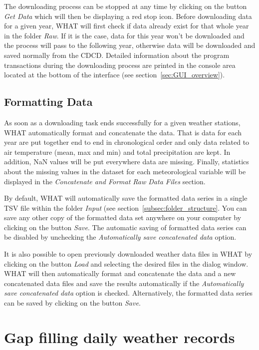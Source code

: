 \documentclass[WHATMANUAL.tex]{subfiles}
\begin{document}
The downloading process can be stopped at any time by clicking on the button \emph{Get Data} which will then be displaying a red stop icon. Before downloading data for a given year, WHAT will first check if data already exist for that whole year in the folder \emph{Raw}. If it is the case, data for this year won't be downloaded and the process will pass to the following year, otherwise data will be downloaded and saved normally from the CDCD. Detailed information about the program transactions during the downloading process are printed in the console area located at the bottom of the interface (see section~\ref{sec:GUI_overview}).

\subsection{Formatting Data}

As soon as a downloading task ends successfully for a given weather stations, WHAT automatically format and concatenate the data. That is data for each year are put together end to end in chronological order and only data related to air temperature (mean, max and min) and total precipitation are kept. In addition, NaN values will be put everywhere data are missing. Finally, statistics about the missing values in the dataset for each meteorological variable will be displayed in the \emph{Concatenate and Format Raw Data Files} section.

By default, WHAT will automatically save the formatted data series in a single TSV file within the folder \emph{Input} (see section~\ref{subsec:folder_structure}. You can save any other copy of the formatted data set anywhere on your computer by clicking on the button \emph{Save}. The automatic saving of formatted data series can be disabled by unchecking the \emph{Automatically save concatenated data} option. 

It is also possible to open previously downloaded weather data files in WHAT by clicking on the button \emph{Load} and selecting the desired files in the dialog window. WHAT will then automatically format and concatenate the data and a new concatenated data files and save the results automatically if the \emph{Automatically save concatenated data} option is checked. Alternatively, the formatted data series can be saved by clicking on the button \emph{Save}.

\section{Gap filling daily weather records}\label{guide-gapfilling}
\end{document}
